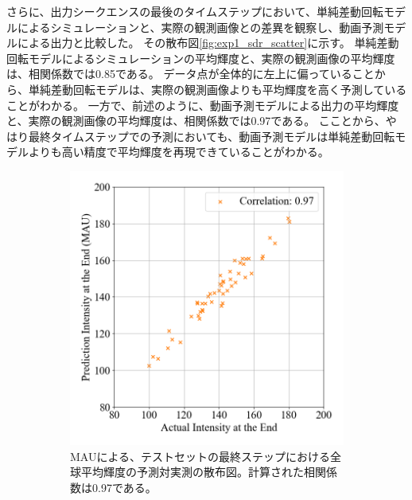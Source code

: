           さらに、出力シークエンスの最後のタイムステップにおいて、単純差動回転モデルによるシミュレーションと、実際の観測画像との差異を観察し、動画予測モデルによる出力と比較した。
          その散布図\ref{fig:exp1_sdr_scatter}に示す。
          単純差動回転モデルによるシミュレーションの平均輝度と、実際の観測画像の平均輝度は、相関係数では0.85である。
          データ点が全体的に左上に偏っていることから、単純差動回転モデルは、実際の観測画像よりも平均輝度を高く予測していることがわかる。
          一方で、前述のように、動画予測モデルによる出力の平均輝度と、実際の観測画像の平均輝度は、相関係数では0.97である。
          こことから、やはり最終タイムステップでの予測においても、動画予測モデルは単純差動回転モデルよりも高い精度で平均輝度を再現できていることがわかる。
          \begin{figure}[htbp]
            \begin{subfigure}[b]{0.55\textwidth}
              \centering
              \includegraphics[width=\textwidth]{figures/exp1/intensity_scatter_gt_pd.png}
              \caption{MAUによる、テストセットの最終ステップにおける全球平均輝度の予測対実測の散布図。計算された相関係数は0.97である。}
            \end{subfigure}
            \begin{subfigure}[b]{0.55\textwidth}
              \centering

\end{subfigure}
\end{figure}
